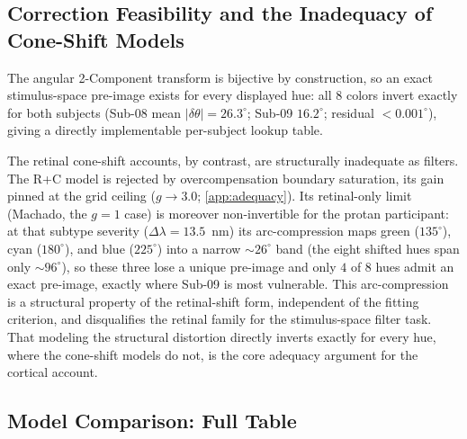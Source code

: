 \documentclass{article}
\begin{document}
\subsection{Correction Feasibility and the Inadequacy of Cone-Shift Models}
\label{app:feasibility}

The angular 2-Component transform is bijective by construction, so an exact stimulus-space pre-image exists for every displayed hue: all 8 colors invert exactly for both subjects (Sub-08 mean $|\delta\theta| = 26.3^\circ$; Sub-09 $16.2^\circ$; residual $<0.001^\circ$), giving a directly implementable per-subject lookup table.

The retinal cone-shift accounts, by contrast, are structurally inadequate as filters.
The R+C model is rejected by overcompensation boundary saturation, its gain pinned at the grid ceiling ($g{\to}3.0$; \cref{app:adequacy}).
Its retinal-only limit (Machado, the $g{=}1$ case) is moreover non-invertible for the protan participant: at that subtype severity ($\Delta\lambda = 13.5$~nm) its arc-compression maps green ($135^\circ$), cyan ($180^\circ$), and blue ($225^\circ$) into a narrow ${\sim}26^\circ$ band (the eight shifted hues span only ${\sim}96^\circ$), so these three lose a unique pre-image and only $4$ of $8$ hues admit an exact pre-image, exactly where Sub-09 is most vulnerable.
This arc-compression is a structural property of the retinal-shift form, independent of the fitting criterion, and disqualifies the retinal family for the stimulus-space filter task.
That modeling the structural distortion directly inverts exactly for every hue, where the cone-shift models do not, is the core adequacy argument for the cortical account.

\subsection{Model Comparison: Full Table}
\end{document}
